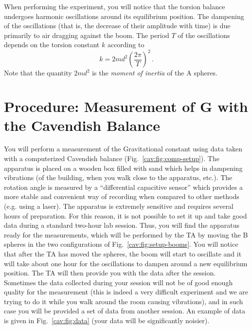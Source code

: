 When performing the experiment, you will notice that the torsion balance undergoes
harmonic oscillations around its equilibrium position. The dampening of the oscillations
(that is, the decrease of their amplitude with time) is due primarily to air dragging against
the boom. The period $T$ of the oscillations depends on the torsion constant $k$ according to
\begin{equation}\label{cav:eq:k}
 k = 2 m d^2 \left( \frac{2 \pi}{T} \right)^2 \,.
\end{equation}
Note that the quantity $2 m d^2$ is the \textit{moment of inertia} of the A spheres.

\section{Procedure: Measurement of $\bm{G}$ with the Cavendish Balance}\label{cav:sec:measurement}

You will perform a measurement of the Gravitational constant using data taken with a
computerized Cavendish balance (Fig.~\ref{cav:fig:comp-setup}). The apparatus is placed on a wooden box filled
with sand which helps in dampening vibrations (of the building, when you walk close to
the apparatus, etc.). The rotation angle is measured by a ``differential capacitive sensor''
which provides a more stable and convenient way of recording when compared to other
methods (e.g. using a laser). The apparatus is extremely sensitive and requires several
hours of preparation. For this reason, it is not possible to set it up and take good data
during a standard two-hour lab session. Thus, you will find the apparatus ready for the
measurements, which will be performed by the TA by moving the B spheres in the two
configurations of Fig.~\ref{cav:fig:setup-booms}. You will notice that after the TA has moved the spheres, the
boom will start to oscillate and it will take about one hour for the oscillations to dampen
around a new equilibrium position. The TA will then provide you with the data after the
session. Sometimes the data collected during your session will not be of good enough
quality for the measurement (this is indeed a very difficult experiment and we are trying
to do it while you walk around the room causing vibrations), and in such case you will
be provided a set of data from another session. An example of data is given in Fig.~\ref{cav:fig:data}
(your data will be significantly noisier).

